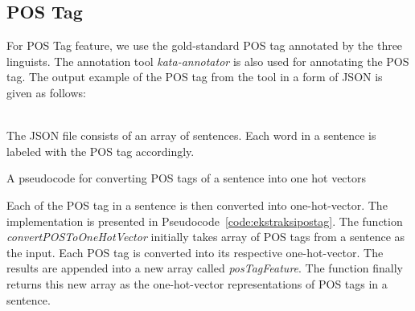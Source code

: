\subsection{POS Tag}
For POS Tag feature, we use the gold-standard POS tag annotated by the three linguists. The annotation tool \textit{kata-annotator} is also used for annotating the POS tag. The output example of the POS tag from the tool in a form of JSON is given as follows:

\\

The JSON file consists of an array of sentences. Each word in a sentence is labeled with the POS tag accordingly.

\begin{kode}
	
	
	\caption{A pseudocode for converting POS tags of a sentence into one hot vectors}
	\label{code:ekstraksipostag}
\end{kode}

Each of the POS tag in a sentence is then converted into one-hot-vector. The implementation is presented in Pseudocode~\ref{code:ekstraksipostag}. The function \textit{convertPOSToOneHotVector} initially takes array of POS tags from a sentence as the input. Each POS tag is converted into its respective one-hot-vector. The results are appended into a new array called \textit{posTagFeature}. The function finally returns this new array as the one-hot-vector representations of POS tags in a sentence.

